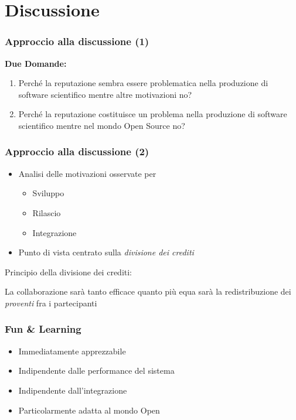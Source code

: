 \section{Discussione}

\begin{frame}\frametitle{Approccio alla discussione (1)}

\Large{\textbf{Due Domande:}}

\begin{enumerate}[<+->]
\def\labelenumi{\arabic{enumi}.}
\item
  Perché la reputazione sembra essere problematica nella produzione di
  software scientifico mentre altre motivazioni no?
\item
  Perché la reputazione costituisce un problema nella produzione di
  software scientifico mentre nel mondo Open Source no?
\end{enumerate}

\end{frame}

\begin{frame}\frametitle{Approccio alla discussione (2)}

\Large

\begin{itemize}[<+->]
\itemsep1pt\parskip0pt
\item
  Analisi delle motivazioni osservate per

  \begin{itemize}[<+->]
  \itemsep1pt\parskip0pt
  \item
    Sviluppo
  \item
    Rilascio
  \item
    Integrazione
  \end{itemize}
\item
  Punto di vista centrato sulla \alert{\em{divisione dei crediti}}
\end{itemize}

\begin{block}{Principio della divisione dei crediti:}

La collaborazione sarà tanto \alert{efficace} quanto più \alert{equa}
sarà la redistribuzione dei \emph{proventi} fra i partecipanti

\end{block}

\end{frame}

\begin{frame}\frametitle{Fun \& Learning}

\Large

\begin{itemize}[<+->]
\itemsep1pt\parskip0pt
\item
  Immediatamente apprezzabile
\item
  Indipendente dalle performance del sistema
\item
  Indipendente dall'integrazione
\item
  Particolarmente adatta al mondo Open
\end{itemize}

\end{frame}

